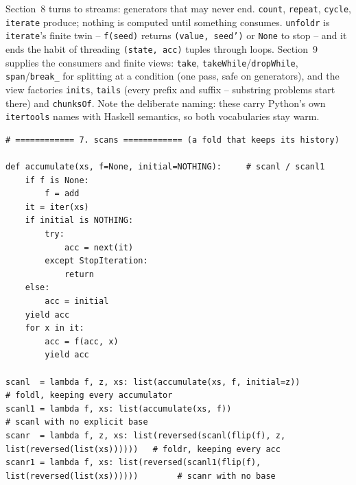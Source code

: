 \documentclass[11pt,letterpaper]{book}
\begin{document}
Section~8 turns to streams: generators that may never end.
\texttt{count}, \texttt{repeat}, \texttt{cycle}, \texttt{iterate} produce;
nothing is computed until something consumes. \texttt{unfoldr} is
\texttt{iterate}'s finite twin -- \texttt{f(seed)} returns \texttt{(value,
seed')} or \texttt{None} to stop -- and it ends the habit of threading
\texttt{(state, acc)} tuples through loops. Section~9 supplies the consumers
and finite views: \texttt{take}, \texttt{takeWhile}/\texttt{dropWhile},
\texttt{span}/\texttt{break\_} for splitting at a condition (one pass, safe
on generators), and the view
factories \texttt{inits}, \texttt{tails} (every prefix and suffix -- substring
problems start there) and \texttt{chunksOf}. Note the deliberate naming: these
carry Python's own \texttt{itertools} names with Haskell semantics, so both
vocabularies stay warm.
\begin{lstlisting}[style=code]
# ============ 7. scans ============ (a fold that keeps its history)

def accumulate(xs, f=None, initial=NOTHING):     # scanl / scanl1
    if f is None:
        f = add
    it = iter(xs)
    if initial is NOTHING:
        try:
            acc = next(it)
        except StopIteration:
            return
    else:
        acc = initial
    yield acc
    for x in it:
        acc = f(acc, x)
        yield acc

scanl  = lambda f, z, xs: list(accumulate(xs, f, initial=z))            # foldl, keeping every accumulator
scanl1 = lambda f, xs: list(accumulate(xs, f))                          # scanl with no explicit base
scanr  = lambda f, z, xs: list(reversed(scanl(flip(f), z, list(reversed(list(xs))))))   # foldr, keeping every acc
scanr1 = lambda f, xs: list(reversed(scanl1(flip(f), list(reversed(list(xs))))))        # scanr with no base
\end{lstlisting}
\end{document}
